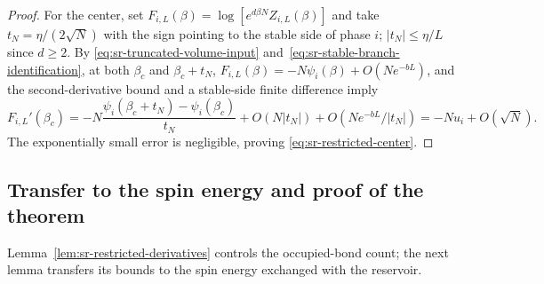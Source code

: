 \begin{proof}
For the center, set
$F_{i,L}(\beta)=\log[e^{d\beta N}Z_{i,L}(\beta)]$ and take
$t_N=\eta/(2\sqrt N)$ with the sign pointing to the stable side of
phase $i$; $|t_N|\le\eta/L$ since $d\ge2$. By
\eqref{eq:sr-truncated-volume-input}
and~\eqref{eq:sr-stable-branch-identification}, at both $\beta_c$ and
$\beta_c+t_N$,
$F_{i,L}(\beta)=-N\psi_i(\beta)+O(Ne^{-bL})$, and the
second-derivative bound and a stable-side finite difference imply
\[
 F_{i,L}'(\beta_c)
 =-N\frac{\psi_i(\beta_c+t_N)-\psi_i(\beta_c)}{t_N}
     +O(N|t_N|)+O(Ne^{-bL}/|t_N|)
 =-Nu_i+O(\sqrt N).
\]
The exponentially small error is negligible, proving
\eqref{eq:sr-restricted-center}.
\end{proof}

\subsection{Transfer to the spin energy and proof of the theorem}
\label{app:sr-transfer}

Lemma~\ref{lem:sr-restricted-derivatives} controls the occupied-bond
count; the next lemma transfers its bounds to the spin energy exchanged
with the reservoir.

